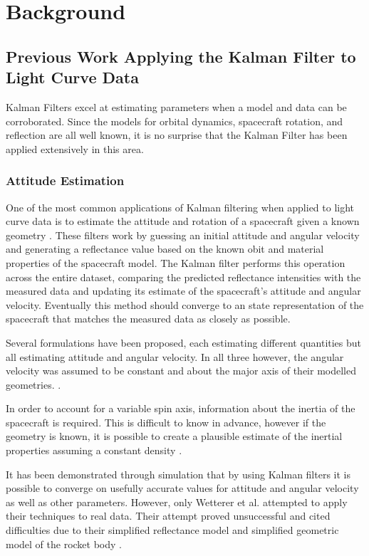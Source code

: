 \chapter{Background}

\section{Previous Work Applying the Kalman Filter to Light Curve Data}

Kalman Filters excel at estimating parameters when a model and data can be corroborated. Since the models for orbital dynamics, spacecraft rotation, and reflection are all well known, it is no surprise that the Kalman Filter has been applied extensively in this area.

\subsection{Attitude Estimation}
One of the most common applications of Kalman filtering when applied to light curve data is to estimate the attitude and rotation of a spacecraft given a known geometry \cite{wetterer_ukf} \cite{Linares_data_fusion} \cite{SpaceObjectCharacterization}. These filters work by guessing an initial attitude and angular velocity and generating a reflectance value based on the known obit and material properties of the spacecraft model. The Kalman filter performs this operation across the entire dataset, comparing the predicted reflectance intensities with the measured data and updating its estimate of the spacecraft's attitude and angular velocity. Eventually this method should converge to an state representation of the spacecraft that matches the measured data as closely as possible.

Several formulations have been proposed, each estimating different quantities but all estimating attitude and angular velocity. In all three however, the angular velocity was assumed to be constant and about the major axis of their modelled geometries. \cite{wetterer_ukf} \cite{Linares_data_fusion} \cite{SpaceObjectCharacterization}.

In order to account for a variable spin axis, information about the inertia of the spacecraft is required. This is difficult to know in advance, however if the geometry is known, it is possible to create a plausible estimate of the inertial properties assuming a constant density \cite{Linares_data_fusion}.

It has been demonstrated through simulation that by using Kalman filters it is possible to converge on usefully accurate values for attitude and angular velocity as well as other parameters. However, only Wetterer et al. attempted to apply their techniques to real data. Their attempt proved unsuccessful and cited difficulties due to their simplified reflectance model and simplified geometric model of the rocket body \cite{wetterer_ukf}.


